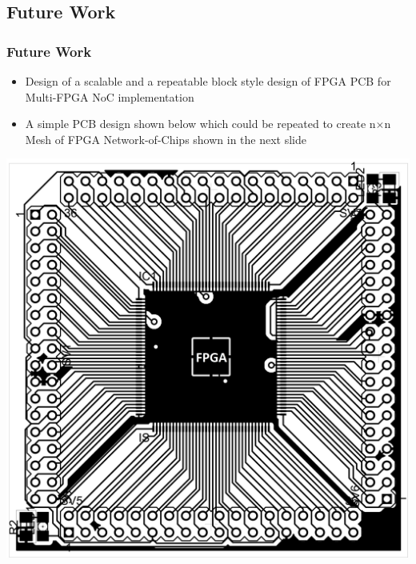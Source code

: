 \subsection{Future Work}
\begin{frame}
\frametitle {Future Work}
\begin {center}
\begin {itemize}
\item Design of a scalable and a repeatable block style design of FPGA PCB for Multi-FPGA NoC implementation
\item A simple PCB design shown below which could be repeated to create n$\times$n Mesh of FPGA Network-of-Chips shown in the next slide
\end {itemize}
\includegraphics[scale=0.5]{./figs/BasicPCB}
\end {center}
\end{frame}

